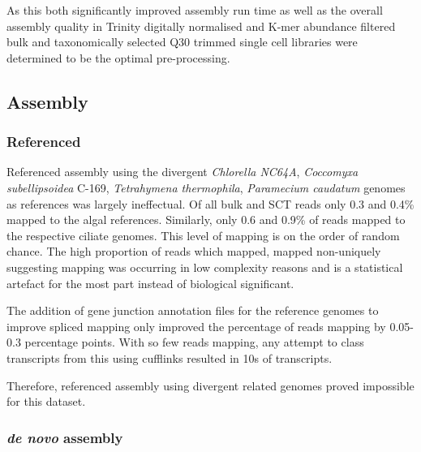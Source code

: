 As this both significantly improved assembly run time as well as the overall
assembly quality in Trinity digitally normalised and K-mer abundance filtered 
bulk and taxonomically selected Q30 trimmed single cell libraries were determined
to be the optimal pre-processing.

\subsection{Assembly}

\subsubsection{Referenced}

Referenced assembly using the divergent \textit{Chlorella NC64A},
\textit{Coccomyxa subellipsoidea} C-169, \textit{Tetrahymena thermophila},
\textit{Paramecium caudatum} genomes as references was largely ineffectual.
Of all bulk and SCT reads only 0.3 and 0.4\% mapped to the 
algal references.  Similarly, only 0.6 and 0.9\% of reads mapped to the 
respective ciliate genomes.   This level of mapping is on the order
of random chance.  The high proportion of reads which mapped, mapped non-uniquely
suggesting mapping was occurring in low complexity reasons and is a statistical
artefact for the most part instead of biological significant.

The addition of gene junction annotation files for the reference genomes to improve
spliced mapping only improved the percentage of reads mapping by 0.05-0.3 percentage points.  
With so few reads mapping, any attempt to 
class transcripts from this using cufflinks resulted in 10s of transcripts.

Therefore, referenced assembly using divergent related genomes proved impossible
for this dataset.

\subsubsection{\textit{de novo} assembly} 

